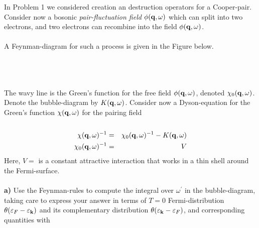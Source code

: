 \begin{problem}
	
In Problem 1 we considered creation an destruction operators for a Cooper-pair. Consider now a bosonic {\it pair-fluctuation field} $\phi({\bf q}, \omega)$ which can split into two electrons, and two electrons can recombine into the field $\phi({\bf q}, \omega)$. 
\ \\
\ \\
A Feynman-diagram for such a process is given in the Figure below. 
\ \\
\ \\
\begin{center}
\end{center}
\ \\
\ \\
The wavy line is the Green's function for the free field $\phi({\bf q},\omega)$, denoted $\chi_0({\bf q}, \omega)$.
Denote the bubble-diagram by $K({\bf q},\omega)$. Consider now a Dyson-equation for the Green's function 
$\chi({\bf q}, \omega)$ for the pairing field
\ \\
\ \\
\begin{eqnarray}
	\chi({\bf q}, \omega)^{-1} & = & \chi_0({\bf q}, \omega)^{-1} - K({\bf q},\omega) \nonumber \\
	\chi_0({\bf q}, \omega)^{-1} & = & V \nonumber
\end{eqnarray} 
Here, $V=$ is a constant attractive interaction that works in a thin shell around the Fermi-surface.  
\ \\
\ \\
{\bf a)} Use the Feynman-rules to compute the integral over $\omega^{\prime}$ in the bubble-diagram, taking care to express your answer in terms of $T=0$ Fermi-distribution $\theta(\varepsilon_F-\varepsilon_{\bf k})$ and its complementary  distribution $\theta(\varepsilon_{\bf k} - \varepsilon_F )$, and corresponding quantities with 

\end{problem}
